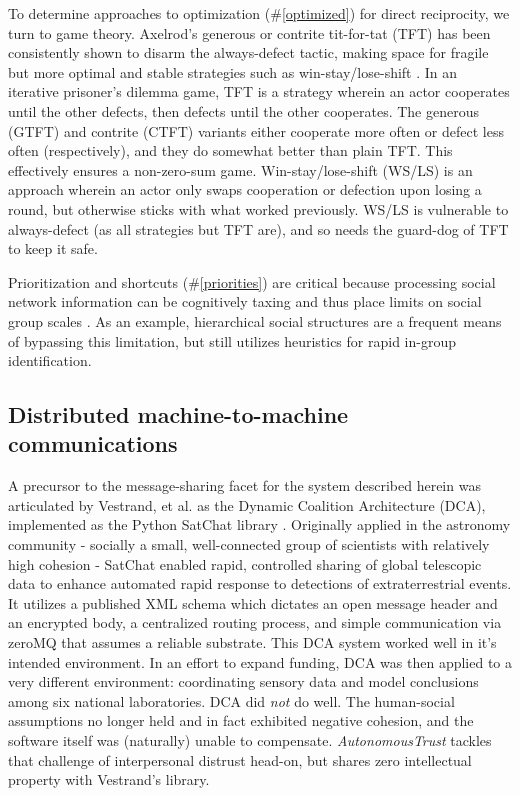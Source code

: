 \documentclass[10pt, twoside]{article}
\newcommand{\projectName}{\emph{AutonomousTrust }}
\begin{document}
To determine approaches to optimization (\#\ref{optimized}) for direct reciprocity, we turn to game theory. Axelrod's generous or contrite tit-for-tat (TFT) has been consistently shown to disarm the always-defect tactic, making space for fragile but more optimal and stable strategies such as win-stay/lose-shift \cite{axelrod1981evolution, axelrod1997complexity, nowak1995arithmetics}. In an iterative prisoner's dilemma game, TFT is a strategy wherein an actor cooperates until the other defects, then defects until the other cooperates. The generous (GTFT) and contrite (CTFT) variants either cooperate more often or defect less often (respectively), and they do somewhat better than plain TFT. This effectively ensures a non-zero-sum game. Win-stay/lose-shift (WS/LS) is an approach wherein an actor only swaps cooperation or defection upon losing a round, but otherwise sticks with what worked previously. WS/LS is vulnerable to always-defect (as all strategies but TFT are), and so needs the guard-dog of TFT to keep it safe.

Prioritization and shortcuts (\#\ref{priorities}) are critical because processing social network information can be cognitively taxing and thus place limits on social group scales \cite{davidbarrett2013processing}. As an example, hierarchical social structures are a frequent means of bypassing this limitation, but still utilizes heuristics for rapid in-group identification.


\subsection{Distributed machine-to-machine communications} \label{m2m}

A precursor to the message-sharing facet for the system described herein was articulated by Vestrand, et al. as the Dynamic Coalition Architecture (DCA), implemented as the Python SatChat library \cite{vestrand2021artificial}. Originally applied in the astronomy community - socially a small, well-connected group of scientists with relatively high cohesion - SatChat enabled rapid, controlled sharing of global telescopic data to enhance automated rapid response to detections of extraterrestrial events. It utilizes a published XML schema which dictates an open message header and an encrypted body, a centralized routing process, and simple communication via zeroMQ that assumes a reliable substrate. This DCA system worked well in it's intended environment. In an effort to expand funding, DCA was then applied to a very different environment: coordinating sensory data and model conclusions among six national laboratories. DCA did \textit{not} do well. The human-social assumptions no longer held and in fact exhibited negative cohesion, and the software itself was (naturally) unable to compensate. \projectName tackles that challenge of interpersonal distrust head-on, but shares zero intellectual property with Vestrand's library.
\end{document}
